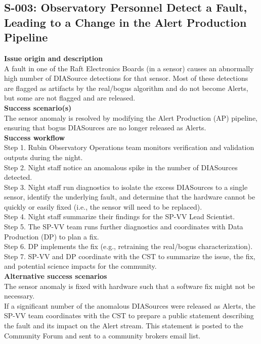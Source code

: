 \subsection{S-003: Observatory Personnel Detect a Fault, Leading to a Change in the Alert Production Pipeline}

\textbf {Issue origin and description} \\
A fault in one of the Raft Electronics Boards (in a sensor) causes an abnormally high number of DIASource detections for that sensor.
Most of these detections are flagged as artifacts by the real/bogus algorithm and do not become Alerts, but some are not flagged and are released. \\

\textbf {Success scenario(s)} \\
The sensor anomaly is resolved by modifying the Alert Production (AP) pipeline, ensuring that bogus DIASources are no longer released as Alerts. \\

\textbf {Success workflow} \\
Step 1. Rubin Observatory Operations team monitors verification and validation outputs during the night.\\
Step 2. Night staff notice an anomalous spike in the number of DIASources detected.\\
Step 3. Night staff run diagnostics to isolate the excess DIASources to a single sensor, identify the underlying fault, and determine that the hardware cannot be quickly or easily fixed (i.e., the sensor will need to be replaced).\\
Step 4. Night staff summarize their findings for the SP-VV Lead Scientist.\\
Step 5. The SP-VV team runs further diagnostics and coordinates with Data Production (DP) to plan a fix.\\
Step 6. DP implements the fix (e.g., retraining the real/bogus characterization).\\
Step 7. SP-VV and DP coordinate with the CST to summarize the issue, the fix, and potential science impacts for the community.\\

\textbf {Alternative success scenarios} \\
The sensor anomaly is fixed with hardware such that a software fix might not be necessary.\\
If a significant number of the anomalous DIASources were released as Alerts, the SP-VV team coordinates with the CST to prepare a public statement describing the fault and its impact on the Alert stream.
This statement is posted to the Community Forum and sent to a community brokers email list.\\

